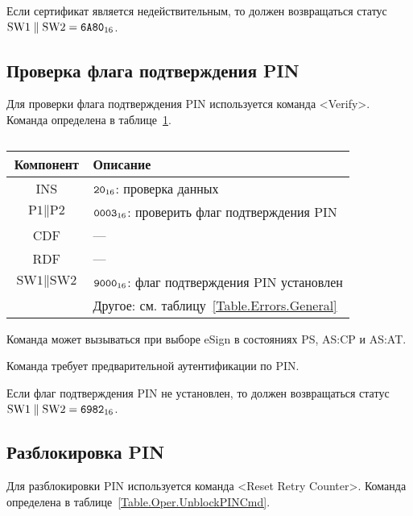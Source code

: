 Если сертификат является недействительным, то должен 
возвращаться статус 
$\text{SW1} \parallel \text{SW2} = \texttt{6A80}_{16}$.

\subsection{Проверка флага подтверждения PIN}
\label{Oper.Descr.VerifyAuth}

Для проверки флага подтверждения PIN используется команда <Verify>.
Команда определена в таблице~\ref{Table.Oper.VerifyAuthCmd}.

\begin{table}[hbt]
\caption{}\label{Table.Oper.VerifyAuthCmd}
\begin{tabular}{|c|p{14cm}|}
\hline
Компонент & Описание \\
\hline
\hline
INS & $\texttt{20}_{16}$: проверка данных\\
\hline
$\text{P1} \parallel \text{P2}$ & $\texttt{0003}_{16}$: проверить 
флаг подтверждения PIN\\
\hline
CDF & --- \\
\hline 
\hline
RDF &  --- \\
\hline
$\text{SW1} \parallel \text{SW2}$ & $\texttt{9000}_{16}$: 
флаг подтверждения PIN установлен\\
\cline{2-2}
 & Другое: см. таблицу~\ref{Table.Errors.General} \\
\hline
\end{tabular}
\end{table}

Команда может вызываться при выборе eSign в состояниях PS, AS:CP и AS:AT. 

Команда требует предварительной аутентификации по PIN.

Если флаг подтверждения PIN не установлен, то должен 
возвращаться статус $\text{SW1} \parallel \text{SW2} = \texttt{6982}_{16}$.

\subsection{Разблокировка PIN}
\label{Oper.Descr.UnblockPIN}

Для разблокировки PIN используется команда <Reset Retry Counter>.
Команда определена в таблице~\ref{Table.Oper.UnblockPINCmd}.

